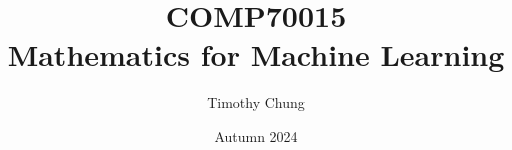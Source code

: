 \documentclass[a4paper,nofonts,notoc,oneside,openany,nobib]{tufte-book}
\title{COMP70015 \\Mathematics for Machine Learning}
\date{Autumn 2024}
\author[Timothy Chung]{Timothy Chung}
\newcommand{\monthyear}{%
  \ifcase\month\or January\or February\or March\or April\or May\or June\or
  July\or August\or September\or October\or November\or
  December\fi\space\number\year
}
\newcommand{\openepigraph}[2]{%
  \begin{fullwidth}
  \sffamily\large
  \begin{doublespace}
  \noindent\allcaps{#1}\\%
  \noindent\allcaps{#2}%
  \end{doublespace}
  \end{fullwidth}
}
\newcommand{\blankpage}{\newpage\hbox{}\thispagestyle{empty}\newpage}
\begin{document}
\frontmatter
\RaggedRight




\begin{fullwidth}
  \begin{raggedright}
    \maketitle
  \end{raggedright}
\end{fullwidth}


\newpage
\begin{fullwidth}
  ~\vfill
  \thispagestyle{empty}
  \setlength{\parindent}{0pt}
  \setlength{\parskip}{\baselineskip}




\end{fullwidth}
\end{document}
